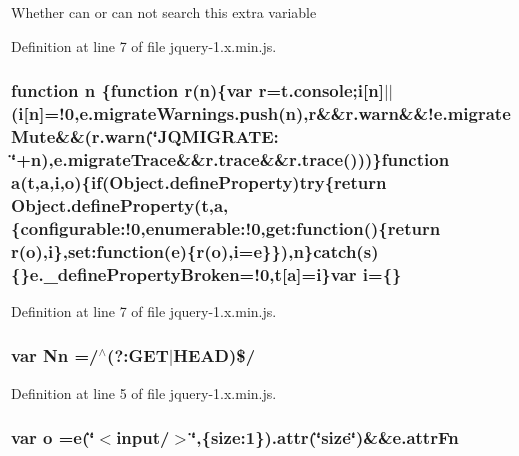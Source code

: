 Whether can or can not search this extra variable 

Definition at line 7 of file jquery-\/1.\+x.\+min.\+js.

\subsubsection[{\texorpdfstring{n}{n}}]{\setlength{\rightskip}{0pt plus 5cm}function n \{function r(n)\{var r=t.\+console;{\bf i}\mbox{[}n\mbox{]}$\vert$$\vert$({\bf i}\mbox{[}n\mbox{]}=!0,{\bf e.\+migrate\+Warnings.\+push}(n),r\&\&r.\+warn\&\&!e.\+migrate\+Mute\&\&(r.\+warn(\char`\"{}J\+Q\+M\+I\+G\+R\+A\+T\+E\+: \char`\"{}+n),{\bf e.\+migrate\+Trace}\&\&r.\+trace\&\&r.\+trace()))\}function {\bf a}({\bf t},{\bf a},{\bf i},{\bf o})\{{\bf if}(Object.\+define\+Property){\bf try}\{return Object.\+define\+Property({\bf t},{\bf a},\{configurable\+:!0,enumerable\+:!0,get\+:function()\{return r({\bf o}),{\bf i}\},set\+:function({\bf e})\{r({\bf o}),{\bf i}={\bf e}\}\}),n\}{\bf catch}({\bf s})\{\}e.\+\_\+define\+Property\+Broken=!0,{\bf t}\mbox{[}{\bf a}\mbox{]}={\bf i}\}var {\bf i}=\{\}}\hypertarget{jquery-1_8x_8min_8js_afc984c4f6c68ce30a0af99006f5f8d27}{}\label{jquery-1_8x_8min_8js_afc984c4f6c68ce30a0af99006f5f8d27}


Definition at line 7 of file jquery-\/1.\+x.\+min.\+js.

\subsubsection[{\texorpdfstring{Nn}{Nn}}]{\setlength{\rightskip}{0pt plus 5cm}var Nn =/$^\wedge$(?\+:G\+ET$\vert$H\+E\+AD)\$/}\hypertarget{jquery-1_8x_8min_8js_a03586bb881647685652f72d98d189ed0}{}\label{jquery-1_8x_8min_8js_a03586bb881647685652f72d98d189ed0}


Definition at line 5 of file jquery-\/1.\+x.\+min.\+js.

\subsubsection[{\texorpdfstring{o}{o}}]{\setlength{\rightskip}{0pt plus 5cm}var o ={\bf e}(\char`\"{}$<$input/$>$\char`\"{},\{size\+:1\}).{\bf attr}(\char`\"{}size\char`\"{})\&\&e.\+attr\+Fn}\hypertarget{jquery-1_8x_8min_8js_a400dc8109620963da8314d4bdfa14f83}{}\label{jquery-1_8x_8min_8js_a400dc8109620963da8314d4bdfa14f83}


